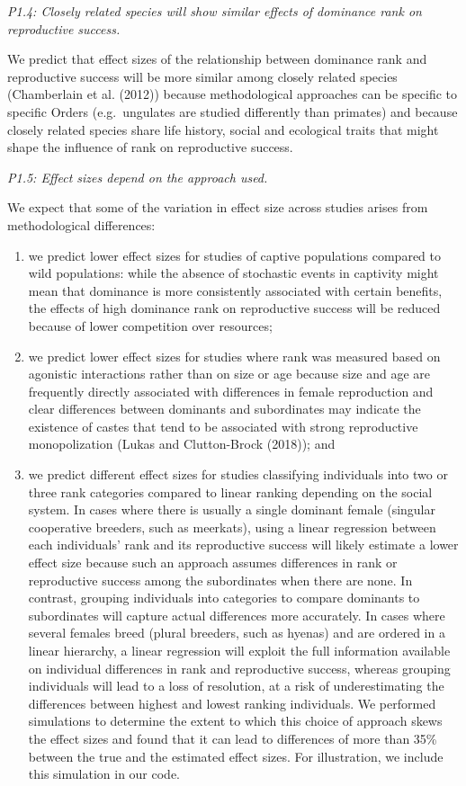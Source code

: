 \documentclass[]{article}
\providecommand{\tightlist}{%
  \setlength{\itemsep}{0pt}\setlength{\parskip}{0pt}}
\begin{document}
\emph{P1.4: Closely related species will show similar effects of
dominance rank on reproductive success.}

We predict that effect sizes of the relationship between dominance rank
and reproductive success will be more similar among closely related
species (Chamberlain et al. (2012)) because methodological approaches
can be specific to specific Orders (e.g.~ungulates are studied
differently than primates) and because closely related species share
life history, social and ecological traits that might shape the
influence of rank on reproductive success.

\emph{P1.5: Effect sizes depend on the approach used.}

We expect that some of the variation in effect size across studies
arises from methodological differences:

\begin{enumerate}
\def\labelenumi{(\roman{enumi})}
\tightlist
\item
  we predict lower effect sizes for studies of captive populations
  compared to wild populations: while the absence of stochastic events
  in captivity might mean that dominance is more consistently associated
  with certain benefits, the effects of high dominance rank on
  reproductive success will be reduced because of lower competition over
  resources;
\item
  we predict lower effect sizes for studies where rank was measured
  based on agonistic interactions rather than on size or age because
  size and age are frequently directly associated with differences in
  female reproduction and clear differences between dominants and
  subordinates may indicate the existence of castes that tend to be
  associated with strong reproductive monopolization (Lukas and
  Clutton-Brock (2018)); and
\item
  we predict different effect sizes for studies classifying individuals
  into two or three rank categories compared to linear ranking depending
  on the social system. In cases where there is usually a single
  dominant female (singular cooperative breeders, such as meerkats),
  using a linear regression between each individuals' rank and its
  reproductive success will likely estimate a lower effect size because
  such an approach assumes differences in rank or reproductive success
  among the subordinates when there are none. In contrast, grouping
  individuals into categories to compare dominants to subordinates will
  capture actual differences more accurately. In cases where several
  females breed (plural breeders, such as hyenas) and are ordered in a
  linear hierarchy, a linear regression will exploit the full
  information available on individual differences in rank and
  reproductive success, whereas grouping individuals will lead to a loss
  of resolution, at a risk of underestimating the differences between
  highest and lowest ranking individuals. We performed simulations to
  determine the extent to which this choice of approach skews the effect
  sizes and found that it can lead to differences of more than 35\%
  between the true and the estimated effect sizes. For illustration, we
  include this simulation in our code.
\end{enumerate}
\end{document}
